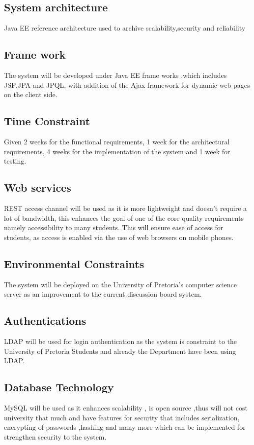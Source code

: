 \begin{flushleft}
			
\subsection*{System architecture} 
Java EE reference architecture used to archive scalability,security and reliability 

\subsection*{Frame work}
The system will be developed under Java EE frame works ,which includes JSF,JPA and JPQL, with addition of the Ajax framework for dynamic web pages on the client side.

\subsection*{Time Constraint} 
Given 2 weeks for the functional requirements, 1 week for the architectural requirements, 4 weeks for the implementation of the system and 1 week for testing.

\subsection*{Web services}
REST access channel will be used as it is more lightweight and doesn't require a lot of bandwidth, this enhances the goal of one of the core quality requirements namely accessibility to many students. This will ensure ease of access for students, as access is enabled via the use of web browsers on mobile phones.

\subsection*{Environmental Constraints}
The system will be deployed on the University of Pretoria's computer science server as an improvement to the current discussion board system.

\subsection*{Authentications}
LDAP will be used for login authentication as the system is constraint to the University of Pretoria Students and already the Department have been using LDAP.

\subsection*{Database Technology}
MySQL will be used as it enhances scalability , is open source ,thus will not cost university that much and have features for security that includes serialization, encrypting of passwords ,hashing and many more which can be implemented for strengthen security to the system.
		
\end{flushleft}
